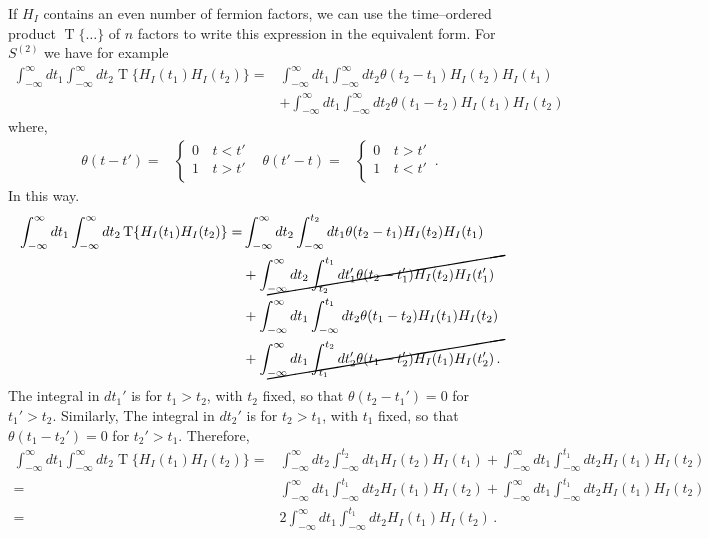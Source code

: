 If $H_I$ contains an even number of fermion factors, we can use the time--ordered product $\operatorname{T}\{\ldots\}$ of $n$ factors to write this expression in the equivalent form. For $S^{(2)}$ we have for example
\begin{align}
 \int_{-\infty}^\infty dt_1 \int_{-\infty}^{\infty}d t_2 \operatorname{T}\{H_I(t_1)H_I(t_2)\}=&
\int_{-\infty}^\infty dt_1\int_{-\infty}^{\infty}d t_2 \theta(t_2-t_1)H_I(t_2)H_I(t_1) \nonumber\\
&+\int_{-\infty}^\infty dt_1\int_{-\infty}^{\infty}d t_2 \theta(t_1-t_2)H_I(t_1)H_I(t_2)
 \end{align}
where,
 \begin{align}
   \theta(t-t')=&
   \begin{cases}
    0\, &    t< t'\\
    1\, &    t> t'\\
   \end{cases}&   \theta(t'-t)=&
   \begin{cases}
    0\, &    t> t'\\
    1\, &    t< t'\\
   \end{cases}\,.
 \end{align}
In this way.
\begin{align}
 \int_{-\infty}^\infty dt_1 \int_{-\infty}^{\infty}d t_2 \operatorname{T}\{H_I(t_1)H_I(t_2)\}=&
\int_{-\infty}^\infty dt_2\int_{-\infty}^{t_2}d t_1 \theta(t_2-t_1)H_I(t_2)H_I(t_1)\nonumber\\
&+\cancel{\int_{-\infty}^\infty dt_2\int_{t_2}^{t_1}d t_1' \theta(t_2-t_1')H_I(t_2)H_I(t_1')} \nonumber\\
&+\int_{-\infty}^\infty dt_1\int_{-\infty}^{t_{1}}d t_2 \theta(t_1-t_2)H_I(t_1)H_I(t_2) \nonumber\\
&+\cancel{\int_{-\infty}^\infty dt_1\int_{t_1}^{t_2}d t_2' \theta(t_1-t_2')H_I(t_1)H_I(t_2')}\,.
\end{align}
The integral in $dt_1'$ is for $t_1>t_2$, with $t_2$ fixed, so that $\theta(t_2-t_1')=0$ for $t_1'>t_2$. Similarly,
The integral in $dt_2'$ is for $t_2>t_1$, with $t_1$ fixed, so that $\theta(t_1-t_2')=0$ for $t_2'>t_1$. Therefore,
\begin{align}
   \int_{-\infty}^\infty dt_1 \int_{-\infty}^{\infty}d t_2 \operatorname{T}\{H_I(t_1)H_I(t_2)\}=&
\int_{-\infty}^\infty dt_2\int_{-\infty}^{t_2}d t_1 H_I(t_2)H_I(t_1)
+\int_{-\infty}^\infty dt_1\int_{-\infty}^{t_{1}}d t_2 H_I(t_1)H_I(t_2)\nonumber\\
=&
\int_{-\infty}^\infty dt_1\int_{-\infty}^{t_1}d t_2 H_I(t_1)H_I(t_2)
+\int_{-\infty}^\infty dt_1\int_{-\infty}^{t_{1}}d t_2 H_I(t_1)H_I(t_2) \nonumber\\
=&
2\int_{-\infty}^\infty dt_1\int_{-\infty}^{t_1}d t_2 H_I(t_1)H_I(t_2)\,.
\end{align}
